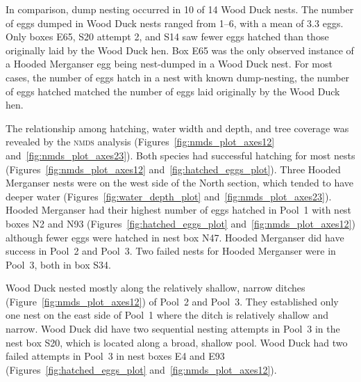 In comparison, dump nesting occurred in 10 of 14 Wood Duck nests. The number of eggs dumped in Wood Duck nests ranged from 1–6, with a mean of 3.3 eggs. Only boxes E65, S20 attempt 2, and S14 saw fewer eggs hatched than those originally laid by the Wood Duck hen. Box E65 was the only observed instance of a Hooded Merganser egg being nest-dumped in a Wood Duck nest. For most cases, the number of eggs hatch in a nest with known dump-nesting, the number of eggs hatched matched the number of eggs laid originally by the Wood Duck hen.


 


The relationship among hatching, water width and depth, and tree coverage was revealed by the \textsc{nmds} analysis (Figures~\ref{fig:nmds_plot_axes12} and~\ref{fig:nmds_plot_axes23}).  Both species had successful hatching for most nests (Figures~\ref{fig:nmds_plot_axes12} and~\ref{fig:hatched_eggs_plot}). Three Hooded Merganser nests were on the west side of the North section, which tended to have deeper water (Figures~\ref{fig:water_depth_plot} and~\ref{fig:nmds_plot_axes23}). Hooded Merganser had their highest number of eggs hatched in Pool~1 with nest boxes N2 and N93 (Figures~\ref{fig:hatched_eggs_plot} and~\ref{fig:nmds_plot_axes12}) although fewer eggs were hatched in nest box N47. Hooded Merganser did have success in Pool~2 and Pool~3. Two failed nests for Hooded Merganser were in Pool~3, both in box S34. 

 

 

Wood Duck nested mostly along the relatively shallow, narrow ditches (Figure~\ref{fig:nmds_plot_axes12}) of Pool~2 and Pool~3. They established only one nest on the east side of Pool~1 where the ditch is relatively shallow and narrow. Wood Duck did have two sequential nesting attempts in Pool~3 in the nest box S20, which is located along a broad, shallow pool. Wood Duck had two failed attempts in Pool~3 in nest boxes E4 and E93 (Figures~\ref{fig:hatched_eggs_plot} and~\ref{fig:nmds_plot_axes12}). %


